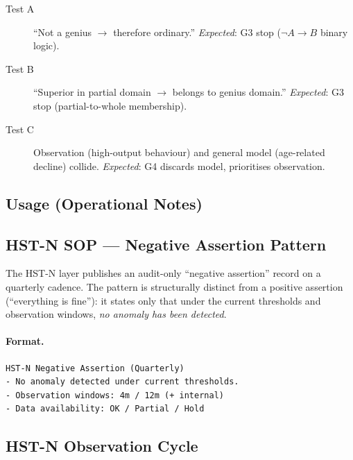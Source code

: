 \begin{description}
\item[Test A] ``Not a genius $\to$ therefore ordinary.''
\textit{Expected}: G3 stop ($\neg A \to B$ binary logic).
\item[Test B] ``Superior in partial domain $\to$ belongs to genius
domain.'' \textit{Expected}: G3 stop (partial-to-whole membership).
\item[Test C] Observation (high-output behaviour) and general model
(age-related decline) collide. \textit{Expected}: G4 discards model,
prioritises observation.
\end{description}

\subsection{Usage (Operational Notes)}
\label{sec:dag-usage-c2}


\subsection{HST-N SOP --- Negative Assertion Pattern}
\label{sec:hstn-negative-assertion-c2}

The HST-N layer publishes an audit-only ``negative assertion''
record on a quarterly cadence. The pattern is structurally distinct
from a positive assertion (``everything is fine''): it states only
that under the current thresholds and observation windows,
\emph{no anomaly has been detected}.

\paragraph{Format.}

\begin{lstlisting}[basicstyle=\ttfamily\small,frame=single]
HST-N Negative Assertion (Quarterly)
- No anomaly detected under current thresholds.
- Observation windows: 4m / 12m (+ internal)
- Data availability: OK / Partial / Hold
\end{lstlisting}

\subsection{HST-N Observation Cycle}
\label{sec:hstn-observation-cycle-c2}

